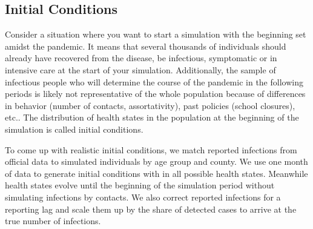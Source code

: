 \subsection{Initial Conditions} %
\label{sub:initial_conditions}

Consider a situation where you want to start a simulation with the beginning set amidst
the pandemic. It means that several thousands of individuals should already have
recovered from the disease, be infectious, symptomatic or in intensive care at the start
of your simulation. Additionally, the sample of infectious people who will determine the
course of the pandemic in the following periods is likely not representative of the whole
population because of differences in behavior (number of contacts, assortativity), past
policies (school closures), etc.. The distribution of health states in the population at
the beginning of the simulation is called initial conditions.

To come up with realistic initial conditions, we match reported infections from official
data to simulated individuals by age group and county. We use one month of data to
generate initial conditions with in all possible health states. Meanwhile health states
evolve until the beginning of the simulation period without simulating infections by
contacts. We also correct reported infections for a reporting lag and scale them up by
the share of detected cases to arrive at the true number of infections.

